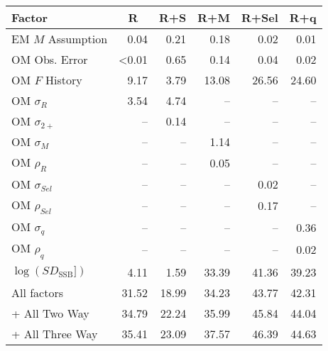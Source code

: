 \begin{center}
\begin{tabular}{lrrrrr}
\hline\hline
\multicolumn{1}{l}{Factor}&\multicolumn{1}{c}{R}&\multicolumn{1}{c}{R+S}&\multicolumn{1}{c}{R+M}&\multicolumn{1}{c}{R+Sel}&\multicolumn{1}{c}{R+q}\tabularnewline
\hline
EM $M$ Assumption& 0.04& 0.21& 0.18& 0.02& 0.01\tabularnewline
OM Obs. Error&\textless  0.01& 0.65& 0.14& 0.04& 0.02\tabularnewline
OM $F$ History& 9.17& 3.79&13.08&26.56&24.60\tabularnewline
OM $\sigma_R$& 3.54& 4.74&--&--&--\tabularnewline
OM $\sigma_{2+}$ &--& 0.14&--&--&--\tabularnewline
OM $\sigma_M$&--&--& 1.14&--&--\tabularnewline
OM $\rho_R$&--&--& 0.05&--&--\tabularnewline
OM $\sigma_{Sel}$&--&--&--& 0.02&--\tabularnewline
OM $\rho_{Sel}$&--&--&--& 0.17&--\tabularnewline
OM $\sigma_q$&--&--&--&--& 0.36\tabularnewline
OM $\rho_q$&--&--&--&--& 0.02\tabularnewline
$\log\left(SD_\text{SSB}]\right)$& 4.11& 1.59&33.39&41.36&39.23\tabularnewline
All factors&31.52&18.99&34.23&43.77&42.31\tabularnewline
+ All Two Way&34.79&22.24&35.99&45.84&44.04\tabularnewline
+ All Three Way&35.41&23.09&37.57&46.39&44.63\tabularnewline
\hline
\end{tabular}\end{center}
